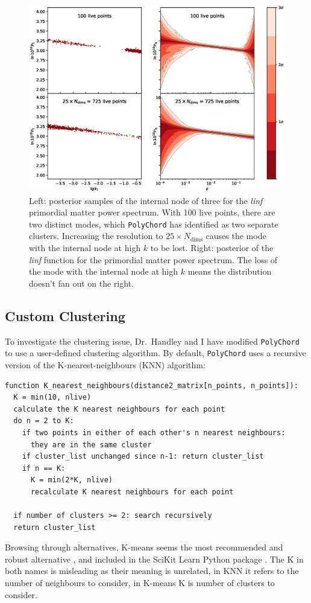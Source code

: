 \documentclass{article}
\begin{document}
\begin{figure}[!ht]
  \centering
  \includegraphics[width=15cm]{N3comparison.eps}
  \caption{Left: posterior samples of the internal node of three for the \textit{linf} primordial matter power spectrum. With 100 live points, there are two distinct modes, which \texttt{PolyChord} has identified as two separate clusters. Increasing the resolution to $25 \times N_\textrm{dims}$ causes the mode with the internal node at high $k$ to be lost. Right: posterior of the \textit{linf} function for the primordial matter power spectrum. The loss of the mode with the internal node at high $k$ means the distribution doesn't fan out on the right.}
  \label{fig:N3}
\end{figure}

\newpage

\subsection{Custom Clustering}
To investigate the clustering issue, Dr.~Handley and I have modified \texttt{PolyChord} to use a user-defined clustering algorithm. By default, \texttt{PolyChord} uses a recursive version of the K-nearest-neighbours (KNN) algorithm:
\begin{verbatim}
function K_nearest_neighbours(distance2_matrix[n_points, n_points]):
  K = min(10, nlive)
  calculate the K nearest neighbours for each point
  do n = 2 to K:
    if two points in either of each other's n nearest neighbours: 
      they are in the same cluster
    if cluster_list unchanged since n-1: return cluster_list
    if n == K: 
      K = min(2*K, nlive)
      recalculate K nearest neighbours for each point
    
  if number of clusters >= 2: search recursively
  return cluster_list
\end{verbatim}
Browsing through alternatives, K-means seems the most recommended and robust alternative \cite{MacKay2003}, and included in the SciKit Learn Python package \cite{scikit-learn}. The K in both names is misleading as their meaning is unrelated, in KNN it refers to the number of neighbours to consider, in K-means K is number of clusters to consider.
\end{document}
